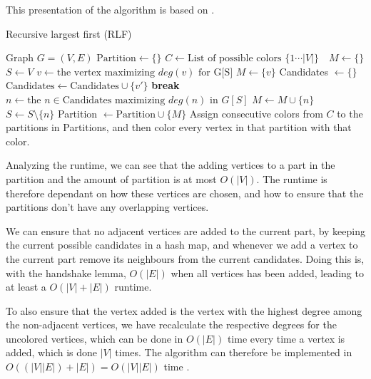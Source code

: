 \documentclass[a4paper]{article}
\newcommand{\algorithmicbreak}{\textbf{break}}
\newcommand{\BREAK}{\STATE \algorithmicbreak}
\begin{document}
This presentation of the algorithm is based on \cite{Constructive}.
\begin{algorithm}[H]
  \caption{Recursive largest first (RLF)}
  \begin{algorithmic}[1]
      \REQUIRE Graph $G = (V,E)$
      \STATE $\text{Partition} \leftarrow \{\}$
      \STATE $C \leftarrow \text{List of possible colors $\{1 \cdots |V| \}$ }$
      \STATE $M \leftarrow \{\}$
      \STATE $S \leftarrow V$
        \STATE $v \leftarrow \text{the vertex maximizing $deg(v)$ for G[S]} $
        \STATE $M \leftarrow \{v\}$
            \STATE Candidates $\leftarrow \{\}$
                    \STATE $\text{Candidates} \leftarrow \text{Candidates}
                    \cup \{v'\}$
                \ENDIF
            \ENDFOR
                \BREAK
            \ENDIF
            \STATE $n \leftarrow \text{the $n \in \text{Candidates}$ maximizing $deg(n)$ in $G[S]$}$ 
            \STATE $M \leftarrow M \cup \{n\}$
            \STATE $S \leftarrow S \setminus \{n\}$
        \ENDWHILE
        \STATE Partition $\leftarrow \text{Partition} \cup \{M\}$ 
      \ENDWHILE
      \STATE Assign consecutive colors from $C$ to the partitions in Partitions,
      and then color every vertex in that partition with that color.
  \end{algorithmic}
\end{algorithm}

Analyzing the runtime, we can see that the adding vertices to a
part in the partition and the amount of partition is at most $O(|V|)$. The
runtime is therefore dependant on how these vertices are chosen, and how to
ensure that the partitions don't have any overlapping vertices. 

We can ensure
that no adjacent vertices are added to the current part, by keeping the current
possible candidates in a hash map, and whenever we add a vertex to the current
part remove its neighbours from the current candidates. Doing this is, with the
handshake lemma, $O(|E|)$ when all vertices has been added, leading to at least
a $O(|V|+|E|)$ runtime.  

To also ensure that the vertex added is the vertex with the highest degree among
the non-adjacent vertices, we have recalculate the respective degrees for the
uncolored vertices, which can be done in $O(|E|)$ time every time a vertex is
added, which is done $|V|$ times. The algorithm can therefore be implemented in
$O((|V||E|)+|E|) = O(|V||E|)$ time \cite{Constructive}.
\end{document}
